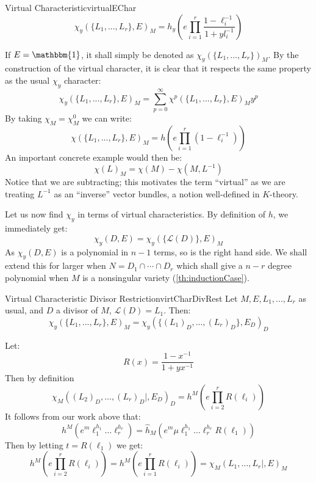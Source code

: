 \documentclass{book}
\newcommand{\CL}{{\mathcal{L}}}
\begin{document}
\begin{defn}{Virtual Characteristic}{virtualEChar}
  \[
  \chi_y(\{L_1, ..., L_r\}, E)_M = h_y\left(e \prod_{i=1}^r \frac{1-\ell_i^{-1}}{1 + yl_i^{-1}}\right)
\]
\end{defn}

If $E = \mathbbm{1}$, it shall simply be denoted as $\chi_y(\{L_1, ..., L_r\})_M$. By the construction of the
virtual character, it is clear that it respects the same property as the usual $\chi_y$ character:
\[
  \chi_y(\{L_1, ..., L_r\}, E)_M = \sum_{p=0}^\infty \chi^p(\{L_1, ..., L_r\}, E)_My^p
\]
By taking $\chi_M = \chi^0_M$ we can write:
\[
  \chi(\{L_1, ..., L_r\}, E)_M = h \left(e \prod_{i=1}^r (1-\ell_i^{-1})\right)
\]
An important concrete example would then be:
\[
  \chi(L)_M = \chi(M) - \chi(M, L^{-1})
\]
Notice that we are subtracting; this motivates the term ``virtual'' as we are treating $L^{-1}$ as an
``inverse'' vector bundles, a notion well-defined in $K$-theory.

Let us now find $\chi_y$ in terms of virtual characteristics. By definition of $h$, we immediately get:
\begin{equation}\label{eq:4'}
  \chi_y(D, E) = \chi_y(\{\CL(D)\}, E)_M
\end{equation}
As $\chi_y(D,E)$ is a polynomial in $n-1$ terms, so is the right hand side. We shall extend this for larger
when $N = D_1\cap\cdots \cap D_r$ which shall give a  $n-r$ degree polynomial when $M$ is a nonsingular
variety (\cref{th:inductionCase}).

\begin{thm}{Virtual Characteristic Divisor Restriction}{virtCharDivRest}
  Let $M, E, L_1, ..., L_r$ as usual, and $D$ a  divisor of $M$, $\CL(D) = L_1$. Then:
  \[
    \chi_y(\{L_1, ..., L_r\}, E)_M = \chi_y( \{(L_1)_D, ..., (L_r)_D\}, E_D)_D
  \]
\end{thm}

\begin{Proof}
  Let:
\[
    R(x) = \frac{1-x^{-1}}{1+yx^{-1}}
\]
Then by definition
\[
    \chi_M((L_2)_D,\ldots,(L_r)_D|,E_D)_D = h^M\left(e\prod_{i=2}^r R(\ell_i)\right)
\]
It follows from our work above that:
\[
    h^M(e^m \ell_1^{h_1}\ldots \ell_r^{h_r}) = \hat{h}_M(e^m\mu \ell_1^{h_1}\ldots \ell_r^{h_r}R(\ell_1))
\]
Then by letting $t=R(\ell_1)$ we get:
\[
    h^M\left(e\prod_{i=2}^r R(\ell_i)\right) = h^M\left(e\prod_{i=1}^r R(\ell_i)\right)
    = \chi_M(L_1,\ldots,L_r|,E)_M
\]
\end{Proof}
\end{document}
